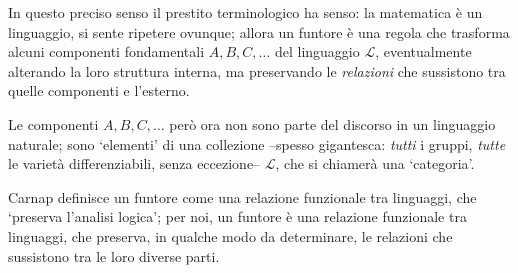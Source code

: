 \medskip
In questo preciso senso il prestito terminologico ha senso: la matematica è un linguaggio, si sente ripetere ovunque; allora un funtore è una regola che trasforma alcuni componenti fondamentali \(A,B,C,\dots\) del linguaggio \(\mathcal{L}\), eventualmente alterando la loro struttura interna, ma preservando le \emph{relazioni} che sussistono tra quelle componenti e l'esterno.
\begin{figure}
	\begin{center}
	\end{center}
	\caption{}
\end{figure}
Le componenti \(A,B,C,\dots\) però ora non sono parte del discorso in un linguaggio naturale; sono `elementi' di una collezione --spesso gigantesca: \emph{tutti} i gruppi, \emph{tutte} le varietà differenziabili, senza eccezione-- \(\mathcal{L}\), che si chiamerà una `categoria'.

Carnap definisce un funtore come una relazione funzionale tra linguaggi, che `preserva l'analisi logica'; per noi, un funtore è una relazione funzionale tra linguaggi, che preserva, in qualche modo da determinare, le relazioni che sussistono tra le loro diverse parti.

